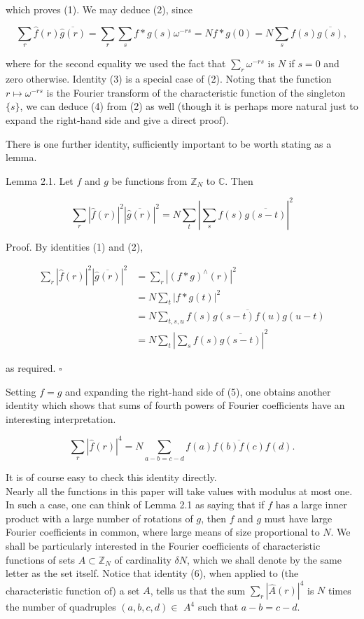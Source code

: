 \documentclass[10pt]{article}
\begin{document}
which proves (1). We may deduce (2), since

$$
\sum_{r} \hat{f}(r) \overline{\hat{g}(r)}=\sum_{r} \sum_{s} f * g(s) \omega^{-r s}=N f * g(0)=N \sum_{s} f(s) \overline{g(s)},
$$

where for the second equality we used the fact that $\sum_{r} \omega^{-r s}$ is $N$ if $s=0$ and zero otherwise. Identity (3) is a special case of (2). Noting that the function $r \mapsto \omega^{-r s}$ is the Fourier transform of the characteristic function of the singleton $\{s\}$, we can deduce (4) from (2) as well (though it is perhaps more natural just to expand the right-hand side and give a direct proof).

There is one further identity, sufficiently important to be worth stating as a lemma.

Lemma 2.1. Let $f$ and $g$ be functions from $\mathbb{Z}_{N}$ to $\mathbb{C}$. Then


\begin{equation*}
\sum_{r}|\hat{f}(r)|^{2}|\overline{\hat{g}(r)}|^{2}=N \sum_{t}\left|\sum_{s} f(s) \overline{g(s-t)}\right|^{2} \tag{5}
\end{equation*}


Proof. By identities (1) and (2),

$$
\begin{aligned}
\sum_{r}|\hat{f}(r)|^{2}|\overline{\hat{g}(r)}|^{2} & =\sum_{r}\left|(f * g)^{\wedge}(r)\right|^{2} \\
& =N \sum_{t}|f * g(t)|^{2} \\
& =N \sum_{t, s, u} f(s) \overline{g(s-t) f(u)} g(u-t) \\
& =N \sum_{t}\left|\sum_{s} f(s) \overline{g(s-t)}\right|^{2}
\end{aligned}
$$

as required. \(\square\)

Setting $f=g$ and expanding the right-hand side of (5), one obtains another identity which shows that sums of fourth powers of Fourier coefficients have an interesting interpretation.


\begin{equation*}
\sum_{r}|\hat{f}(r)|^{4}=N \sum_{a-b=c-d} f(a) \overline{f(b) f(c)} f(d) . \tag{6}
\end{equation*}


It is of course easy to check this identity directly.\\
Nearly all the functions in this paper will take values with modulus at most one. In such a case, one can think of Lemma 2.1 as saying that if $f$ has a large inner product with a large number of rotations of $g$, then $f$ and $g$ must have large Fourier coefficients in common, where large means of size proportional to $N$. We shall be particularly interested in the Fourier coefficients of characteristic functions of sets $A \subset \mathbb{Z}_{N}$ of cardinality $\delta N$, which we shall denote by the same letter as the set itself. Notice that identity (6), when applied to (the characteristic function of) a set $A$, tells us that the sum $\sum_{r}|\hat{A}(r)|^{4}$ is $N$ times the number of quadruples $(a, b, c, d) \in$ $A^{4}$ such that $a-b=c-d$.
\end{document}
